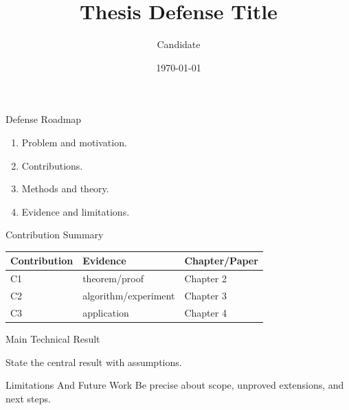 \documentclass[10pt,aspectratio=169]{beamer}
\title{Thesis Defense Title}
\author{Candidate}
\institute{Department}
\date{\today}
\begin{document}
\begin{frame}\titlepage\end{frame}
\begin{frame}{Defense Roadmap}
  \begin{enumerate}
    \item Problem and motivation.
    \item Contributions.
    \item Methods and theory.
    \item Evidence and limitations.
  \end{enumerate}
\end{frame}

\begin{frame}{Contribution Summary}
  \begin{tabular}{lll}
    \toprule
    Contribution & Evidence & Chapter/Paper \\
    \midrule
    C1 & theorem/proof & Chapter 2 \\
    C2 & algorithm/experiment & Chapter 3 \\
    C3 & application & Chapter 4 \\
    \bottomrule
  \end{tabular}
\end{frame}

\begin{frame}{Main Technical Result}
  \begin{theorem}
    State the central result with assumptions.
  \end{theorem}
\end{frame}

\begin{frame}{Limitations And Future Work}
  Be precise about scope, unproved extensions, and next steps.
\end{frame}
\end{document}
